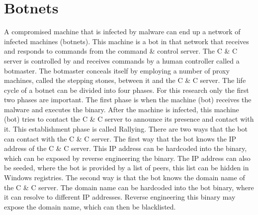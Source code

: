 \section{Botnets}
A compromised machine that is infected
by malware can end up a network of infected machines (botnets). This machine is
a bot in that network that receives and responds to commands from the command \&
control server. The C \& C server is controlled by and receives commands by a
human controller called a botmaster. The botmaster conceals itself by employing
a number of proxy machines, called the stepping stones, between it and the C \&
C server.  
\pagebreak 
The life cycle of a botnet can be divided into four
phases. For this research only the first two phases are important. The first
phase is when the machine (bot) receives the malware and executes the binary.
After the machine is infected, this machine (bot) tries to contact the C \& C
server to announce its presence and contact with it. This establishment phase is
called Rallying. There are two ways that the bot can contact with the C \& C
server. The first way that the bot knows the IP address of the C \& C server.
This IP address can be hardcoded into the binary, which can be exposed 
by reverse engineering the binary. The IP address can also be seeded,
where the bot is provided by a list of peers, this list can be hidden in Windows
registries.  The second way is that the bot knows the domain name of the C \& C
server.  The domain name can be hardcoded into the bot binary, where it can
resolve to different IP addresses.  Reverse engineering this binary may expose
the domain name, which can then be blacklisted.
